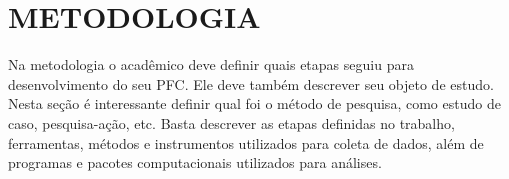 
\chapter{METODOLOGIA} %
\label{metodologia}

Na metodologia o acadêmico deve definir quais etapas seguiu para desenvolvimento do seu PFC. Ele deve também descrever seu objeto de estudo. Nesta seção é interessante definir qual foi o método de pesquisa, como estudo de caso, pesquisa-ação, etc. Basta descrever as etapas definidas no trabalho, ferramentas, métodos e instrumentos utilizados para coleta de dados, além de programas e pacotes computacionais utilizados para análises.